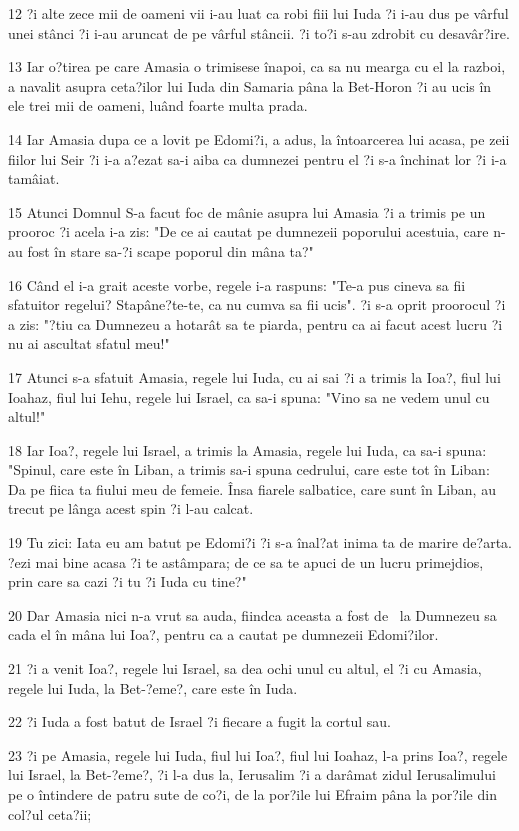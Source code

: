 \par 12 ?i alte zece mii de oameni vii i-au luat ca robi fiii lui Iuda ?i i-au dus pe vârful unei stânci ?i i-au aruncat de pe vârful stâncii. ?i to?i s-au zdrobit cu desavâr?ire.
\par 13 Iar o?tirea pe care Amasia o trimisese înapoi, ca sa nu mearga cu el la razboi, a navalit asupra ceta?ilor lui Iuda din Samaria pâna la Bet-Horon ?i au ucis în ele trei mii de oameni, luând foarte multa prada.
\par 14 Iar Amasia dupa ce a lovit pe Edomi?i, a adus, la întoarcerea lui acasa, pe zeii fiilor lui Seir ?i i-a a?ezat sa-i aiba ca dumnezei pentru el ?i s-a închinat lor ?i i-a tamâiat.
\par 15 Atunci Domnul S-a facut foc de mânie asupra lui Amasia ?i a trimis pe un prooroc ?i acela i-a zis: "De ce ai cautat pe dumnezeii poporului acestuia, care n-au fost în stare sa-?i scape poporul din mâna ta?"
\par 16 Când el i-a grait aceste vorbe, regele i-a raspuns: "Te-a pus cineva sa fii sfatuitor regelui? Stapâne?te-te, ca nu cumva sa fii ucis". ?i s-a oprit proorocul ?i a zis: "?tiu ca Dumnezeu a hotarât sa te piarda, pentru ca ai facut acest lucru ?i nu ai ascultat sfatul meu!"
\par 17 Atunci s-a sfatuit Amasia, regele lui Iuda, cu ai sai ?i a trimis la Ioa?, fiul lui Ioahaz, fiul lui Iehu, regele lui Israel, ca sa-i spuna: "Vino sa ne vedem unul cu altul!"
\par 18 Iar Ioa?, regele lui Israel, a trimis la Amasia, regele lui Iuda, ca sa-i spuna: "Spinul, care este în Liban, a trimis sa-i spuna cedrului, care este tot în Liban: Da pe fiica ta fiului meu de femeie. Însa fiarele salbatice, care sunt în Liban, au trecut pe lânga acest spin ?i l-au calcat.
\par 19 Tu zici: Iata eu am batut pe Edomi?i ?i s-a înal?at inima ta de marire de?arta. ?ezi mai bine acasa ?i te astâmpara; de ce sa te apuci de un lucru primejdios, prin care sa cazi ?i tu ?i Iuda cu tine?"
\par 20 Dar Amasia nici n-a vrut sa auda, fiindca aceasta a fost de  la Dumnezeu sa cada el în mâna lui Ioa?, pentru ca a cautat pe dumnezeii Edomi?ilor.
\par 21 ?i a venit Ioa?, regele lui Israel, sa dea ochi unul cu altul, el ?i cu Amasia, regele lui Iuda, la Bet-?eme?, care este în Iuda.
\par 22 ?i Iuda a fost batut de Israel ?i fiecare a fugit la cortul sau.
\par 23 ?i pe Amasia, regele lui Iuda, fiul lui Ioa?, fiul lui Ioahaz, l-a prins Ioa?, regele lui Israel, la Bet-?eme?, ?i l-a dus la, Ierusalim ?i a darâmat zidul Ierusalimului pe o întindere de patru sute de co?i, de la por?ile lui Efraim pâna la por?ile din col?ul ceta?ii;

